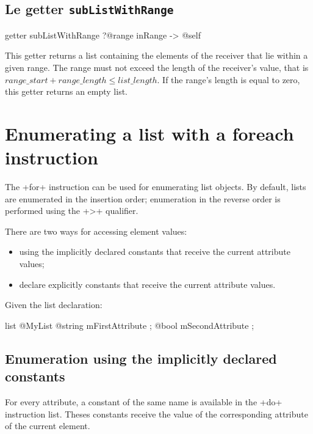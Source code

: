 \subsection{Le getter \texttt{subListWithRange}}

\begin{galgas}
getter subListWithRange
  ?@range inRange
  -> @self
\end{galgas}

This getter returns a list containing the elements of the receiver that lie within a given range. The range must not exceed the length of the receiver's value, that is $range\_start + range\_length \leqslant list\_length$. If the range's length is equal to zero, this getter returns an empty list.





\section{Enumerating a list with a foreach instruction}

The \ggs+for+ instruction can be used for enumerating list objects. By default, lists are enumerated in the insertion order; enumeration in the reverse order is performed using the \ggs+>+ qualifier.

There are two ways for accessing element values:
\begin{itemize}
\item using the implicitly declared constants that receive the current attribute values;
\item declare explicitly constants that receive the current attribute values.
\end{itemize}

Given the list declaration:

\begin{galgas}
list @MyList {
  @string mFirstAttribute ;
  @bool mSecondAttribute ;
}
\end{galgas}

\subsection{Enumeration using the implicitly declared constants}

For every attribute, a constant of the same name is available in the \ggs+do+ instruction list. Theses constants receive the value of the corresponding attribute of the current element.

